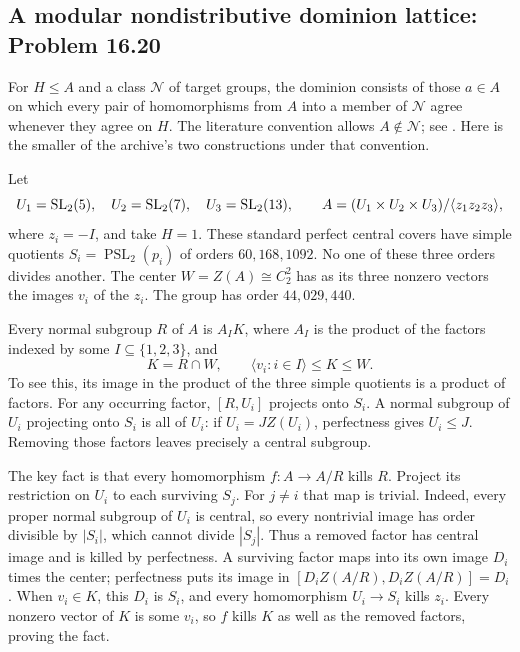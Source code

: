 \subsection{A modular nondistributive dominion lattice: Problem 16.20}
\label{cand:16.20}

For \(H\leq A\) and a class \(\mathcal N\) of target groups,
the dominion consists of those \(a\in A\) on which every pair
of homomorphisms from \(A\) into a member of \(\mathcal N\)
agree whenever they agree on \(H\). The literature convention
allows \(A\notin\mathcal N\); see
\cite{shakhova-dominions}. Here is the smaller of the archive's
two constructions under that convention.

Let
\[
 U_1=\operatorname{SL}_2(5),\quad U_2=\operatorname{SL}_2(7),\quad U_3=\operatorname{SL}_2(13),
 \qquad A=(U_1\times U_2\times U_3)/\langle z_1z_2z_3\rangle,
\]
where \(z_i=-I\), and take \(H=1\).
These standard perfect central covers have simple quotients
\(S_i=\operatorname{PSL}_2(p_i)\) of orders \(60,168,1092\).
No one of these three orders divides another. The center
\(W=Z(A)\cong C_2^2\) has as its three nonzero vectors the
images \(v_i\) of the \(z_i\). The group has order
\(44{,}029{,}440\).

Every normal subgroup \(R\) of \(A\) is \(A_I K\), where
\(A_I\) is the product of the factors indexed by some
\(I\subseteq\{1,2,3\}\), and
\[
 K=R\cap W,\qquad \langle v_i:i\in I\rangle\leq K\leq W.
\]
To see this, its image in the product of the three simple
quotients is a product of factors. For any occurring factor,
\([R,U_i]\) projects onto \(S_i\). A normal subgroup of
\(U_i\) projecting onto \(S_i\) is all of \(U_i\):
if \(U_i=JZ(U_i)\), perfectness gives \(U_i\leq J\).
Removing those factors leaves precisely a central subgroup.

The key fact is that every homomorphism \(f:A\to A/R\)
kills \(R\). Project its restriction on \(U_i\) to each
surviving \(S_j\). For \(j\ne i\) that map is trivial.
Indeed, every proper normal subgroup of \(U_i\) is central,
so every nontrivial image has order divisible by \(|S_i|\),
which cannot divide \(|S_j|\). Thus a removed factor has
central image and is killed by perfectness. A surviving
factor maps into its own image \(D_i\) times the center;
perfectness puts its image in
\([D_iZ(A/R),D_iZ(A/R)]=D_i\).
When \(v_i\in K\), this \(D_i\) is \(S_i\), and every
homomorphism \(U_i\to S_i\) kills \(z_i\). Every nonzero
vector of \(K\) is some \(v_i\), so \(f\) kills \(K\)
as well as the removed factors, proving the fact.

